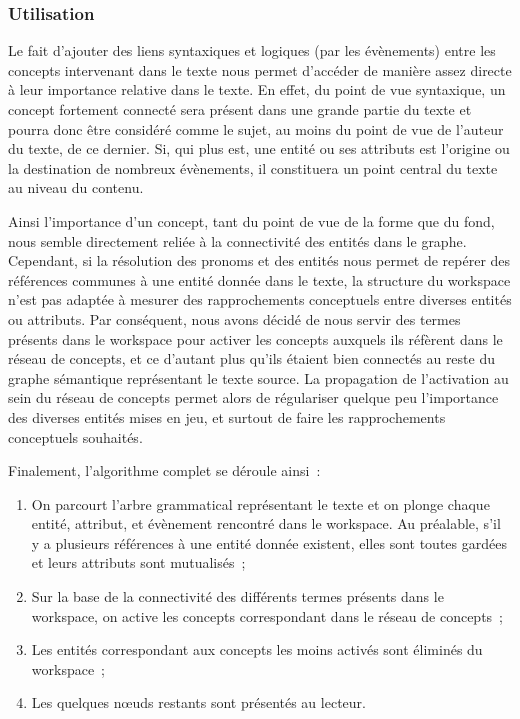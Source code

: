 \documentclass[a4paper, 12pt]{article}
\begin{document}
\subsubsection{Utilisation}

Le fait d'ajouter des liens syntaxiques et logiques (par les évènements) entre les concepts intervenant dans le texte nous permet d'accéder de manière assez directe à leur importance relative dans le texte. En effet, du point de vue syntaxique, un concept fortement connecté sera présent dans une grande partie du texte et pourra donc être considéré comme le sujet, au moins du point de vue de l'auteur du texte, de ce dernier. Si, qui plus est, une entité ou ses attributs est l'origine ou la destination de nombreux évènements, il constituera un point central du texte au niveau du contenu.

Ainsi l'importance d'un concept, tant du point de vue de la forme que du fond, nous semble directement reliée à la connectivité des entités dans le graphe. Cependant, si la résolution des pronoms et des entités nous permet de repérer des références communes à une entité donnée dans le texte, la structure du workspace n'est pas adaptée à mesurer des rapprochements conceptuels entre diverses entités ou attributs. Par conséquent, nous avons décidé de nous servir des termes présents dans le workspace pour activer les concepts auxquels ils réfèrent dans le réseau de concepts, et ce d'autant plus qu'ils étaient bien connectés au reste du graphe sémantique représentant le texte source. La propagation de l'activation au sein du réseau de concepts permet alors de régulariser quelque peu l'importance des diverses entités mises en jeu, et surtout de faire les rapprochements conceptuels souhaités.

Finalement, l'algorithme complet se déroule ainsi~:

\begin{enumerate}
	\item On parcourt l'arbre grammatical représentant le texte et on plonge chaque entité, attribut, et évènement rencontré dans le workspace. Au préalable, s'il y a plusieurs références à une entité donnée existent, elles sont toutes gardées et leurs attributs sont mutualisés~;
	\item Sur la base de la connectivité des différents termes présents dans le workspace, on active les concepts correspondant dans le réseau de concepts~;
	\item Les entités correspondant aux concepts les moins activés sont éliminés du workspace~;
	\item Les quelques nœuds restants sont présentés au lecteur.
\end{enumerate}
\end{document}
